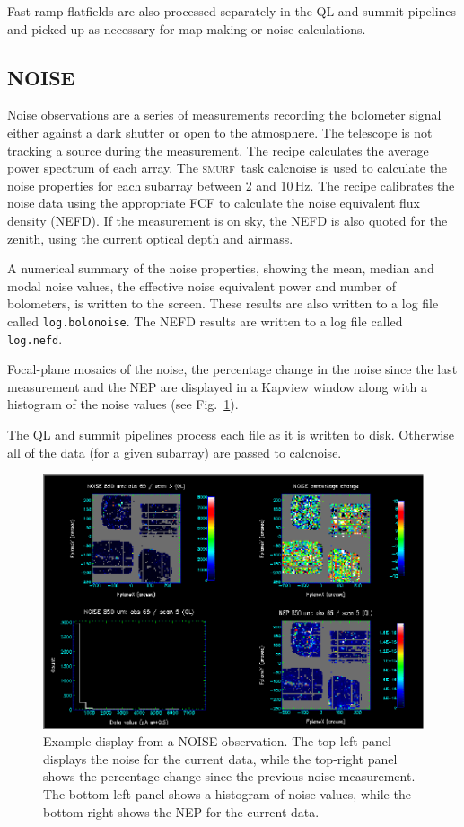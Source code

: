 \documentclass[twoside,11pt,nolof]{starlink}
\providecommand{\SMURF}{\textsc{smurf}}
\providecommand{\task}[1]{\textsf{#1}}
\begin{document}
Fast-ramp flatfields are also processed separately in the QL and
summit pipelines and picked up as necessary for map-making or noise
calculations.

\subsection{NOISE}

Noise observations are a series of measurements recording the
bolometer signal either against a dark shutter or open to the
atmosphere. The telescope is not tracking a source during the
measurement. The recipe calculates the average power spectrum of each
array. The \SMURF\ task \task{calcnoise} is used to calculate the
noise properties for each subarray between 2 and 10\,Hz. The recipe
calibrates the noise data using the appropriate FCF to calculate the
noise equivalent flux density (NEFD). If the measurement is on sky,
the NEFD is also quoted for the zenith, using the current optical
depth and airmass.

A numerical summary of the noise properties, showing the mean, median
and modal noise values, the effective noise equivalent power and
number of bolometers, is written to the screen. These results are also
written to a log file called \verb+log.bolonoise+. The NEFD results
are written to a log file called \verb+log.nefd+.

Focal-plane mosaics of the noise, the percentage change in the noise
since the last measurement and the NEP are displayed in a Kapview
window along with a histogram of the noise values (see
Fig.~\ref{fig:noise}).

The QL and summit pipelines process each file as it is written to
disk. Otherwise all of the data (for a given subarray) are passed to
\task{calcnoise}.

\begin{figure}[t]
\centering
\includegraphics[width=\textwidth]{sun264_noise}
\caption{Example display from a NOISE observation. The top-left panel
  displays the noise for the current data, while the top-right panel
  shows the percentage change since the previous noise
  measurement. The bottom-left panel shows a histogram of noise
  values, while the bottom-right shows the NEP for the current
  data.\label{fig:noise}}
\end{figure}
\end{document}
